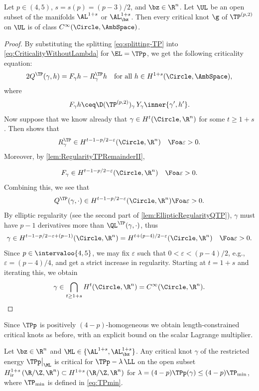 \begin{theorem}\label{thm:smoothness-TP-new}
    Let $p\in (4,5)$, $s=s(p) = (p-3)/2$, and  $\bz\in\R^n$. 
    Let $\UL$ be an open subset of the manifolds $\AL^{1+s}$ or $\AL^{1+s}_\bz$.
    Then every critical knot $\g$ of $\TP^{(p,2)}$ on $\UL$ is of class $C^\infty(\Circle,\AmbSpace)$. 
\end{theorem}
\begin{proof}
    By substituting the splitting \cref{eq:splitting-TP} into \cref{eq:CriticalityWithoutLambda} for $ \EL=\TPp $, we 
    get the following criticality equation:
    \[
        2Q^{\TP}(\gamma,h)
        =
        F_\gamma h
        - 
        R^{\TP}_\gamma h
        \quad
        \text{for all $h \in H^{1+s}(\Circle,\AmbSpace)$}
        ,
    \]
    where 
    \[
        F_\gamma  h \ceq \D(\TP^{(p,2)})_\gamma \, Y_\gamma \inner{\gamma',h'}.
    \]
    Now suppose that we know already that $\gamma \in H^t(\Circle,\R^n)$ for some $t \geq 1 + s$.
    Then \cite[Proposition 4.3]{blatt-reiter_2015a} shows that 
    \[
        R^{\TP}_\gamma \in H^{t-1-p/2-\varepsilon}(\Circle,\R^n)\quad\Foa\varepsilon>0.
    \]
    Moreover, by \cref{lem:RegularityTPRemainderII}, 
    
    \[
        F_\gamma \in
        H^{t-1-p/2-\varepsilon}(\Circle,\R^n) \quad\Foa\varepsilon>0
        .
    \]
    Combining this, we see that 
    \[
        Q^{\TP}(\gamma,\cdot) \in H^{t-1-p/2-\varepsilon}(\Circle,\R^n) \Foa \varepsilon>0.
    \]
    By elliptic regularity (see the second part of \cref{lem:EllipticRegularityQTP}), $\gamma$ must have $p-1$ derivatives more than $\QL^{\TP}(\gamma,\cdot)$, thus
    \[
        \gamma \in 
        H^{t-1-p/2-\varepsilon + (p-1)}(\Circle,\R^n)
        =
        H^{t+(p-4)/2 - \varepsilon}(\Circle,\R^n)\quad\Foa\varepsilon>0
        .
    \]
    Since $p \in \intervaloo{4,5}$, we may fix $\varepsilon$ such that $0 < \varepsilon < (p-4)/2$, e.g., $ \varepsilon=(p-4)/{4}$, and get a strict increase in regularity.
    Starting at $t = 1 + s$ and iterating this, we obtain
    \[
        \gamma \in \bigcap_{t \geq 1+s} H^{t}(\Circle,\R^n) = C^\infty(\Circle,\R^n).
    \]
\end{proof}
Since $ \TPp $ is positively $ (4-p) $-homogeneous we obtain length-constrained critical knots as before, with an explicit bound on the scalar Lagrange multiplier. 
\begin{corollary}\label{cor:TP_critical_knots}
    Let $ \bz\in\R^n $ and $ \ML\in\{\AL^{1+s},\AL^{1+s}_\bz\} $. 
    Any critical knot $ \gamma $ of the restricted energy $ \TPp\big\vert_{\ML} $ is critical for $ \TPp-\lambda\,\LL $ on the open subset $ H^{1+s}_{\mathrm{ir}}\left( \R/\Z,\R^n \right)\subset H^{1+s}\left( \R/\Z,\R^n \right)$ for $ \lambda=(4-p)\TPp(\gamma)\le(4-p)\TP_{\min} $, where $ \TP_{\min} $ is defined in \cref{eq:TPmin}.
\end{corollary}

